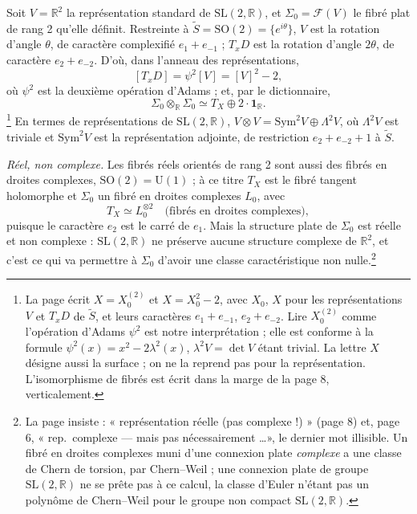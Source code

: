 \documentclass[11pt,a4paper]{article}
\begin{document}
Soit $V = \mathbb{R}^{2}$ la représentation standard de $\mathrm{SL}(2,
\mathbb{R})$, et $\Sigma_{0} = \mathcal{F}(V)$ le fibré plat de rang 2 qu'elle
définit. Restreinte à $\widetilde{S} = \mathrm{SO}(2) = \{e^{i\theta}\}$, $V$
est la rotation d'angle $\theta$, de caractère complexifié $e_{1} + e_{-1}$ ;
$T_{x}D$ est la rotation d'angle $2\theta$, de caractère $e_{2} + e_{-2}$.
D'où, dans l'anneau des représentations,
\[
  [T_{x}D] = \psi^{2}[V] = [V]^{2} - 2,
\]
où $\psi^{2}$ est la deuxième opération d'Adams ; et, par le dictionnaire,
\[
  \Sigma_{0} \otimes_{\mathbb{R}} \Sigma_{0} \simeq T_{X} \oplus
  2 \cdot \mathbf{1}_{\mathbb{R}} .
\]
\footnote{La page écrit $X = X_{0}^{(2)}$ et $X = X_{0}^{2} - 2$, avec
$X_{0}$, $X$ pour les représentations $V$ et $T_{x}D$ de $\widetilde{S}$, et
leurs caractères $e_{1} + e_{-1}$, $e_{2} + e_{-2}$. Lire $X_{0}^{(2)}$ comme
l'opération d'Adams $\psi^{2}$ est notre interprétation ; elle est conforme
à la formule $\psi^{2}(x) = x^{2} - 2\lambda^{2}(x)$, $\lambda^{2}V =
\det V$ étant trivial. La lettre $X$ désigne aussi la surface ; on ne la
reprend pas pour la représentation. L'isomorphisme de fibrés est écrit dans
la marge de la page 8, verticalement.} En termes de représentations de
$\mathrm{SL}(2,\mathbb{R})$, $V \otimes V = \mathrm{Sym}^{2} V \oplus
\Lambda^{2} V$, où $\Lambda^{2}V$ est triviale et $\mathrm{Sym}^{2}V$ est la
représentation adjointe, de restriction $e_{2} + e_{-2} + 1$ à
$\widetilde{S}$.

\emph{Réel, non complexe.} Les fibrés réels orientés de rang 2 sont aussi des
fibrés en droites complexes, $\mathrm{SO}(2) = \mathrm{U}(1)$ ; à ce titre
$T_{X}$ est le fibré tangent holomorphe et $\Sigma_{0}$ un fibré en droites
complexes $L_{0}$, avec
\[
  T_{X} \simeq L_{0}^{\otimes 2} \quad \text{(fibrés en droites complexes)},
\]
puisque le caractère $e_{2}$ est le carré de $e_{1}$. Mais la structure plate
de $\Sigma_{0}$ est réelle et non complexe : $\mathrm{SL}(2,\mathbb{R})$ ne
préserve aucune structure complexe de $\mathbb{R}^{2}$, et c'est ce qui va
permettre à $\Sigma_{0}$ d'avoir une classe caractéristique non
nulle.\footnote{La page insiste : « représentation réelle (pas complexe !) »
(page 8) et, page 6, « rep.\ complexe --- mais pas nécessairement \ldots »,
le dernier mot illisible. Un fibré en droites complexes muni d'une connexion
plate \emph{complexe} a une classe de Chern de torsion, par Chern--Weil ;
une connexion plate de groupe $\mathrm{SL}(2,\mathbb{R})$ ne se prête pas à
ce calcul, la classe d'Euler n'étant pas un polynôme de Chern--Weil pour le
groupe non compact $\mathrm{SL}(2,\mathbb{R})$.}
\end{document}

